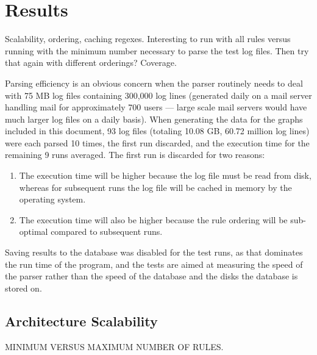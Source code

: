 \documentclass[draft]{svmult}
\newcommand{\numberOFlogFILES}[0]{%
    93%
}
\newcommand{\numberOFlogLINEShuman}[0]{%
    60.72 million%
}
\begin{document}
\section{Results}

Scalability, ordering, caching regexes.  Interesting to run with all rules
versus running with the minimum number necessary to parse the test log
files.  Then try that again with different orderings?  Coverage.

Parsing efficiency is an obvious concern when the parser routinely needs to
deal with 75 MB log files containing 300,000 log lines (generated daily on
a mail server handling mail for approximately 700 users --- large scale
mail servers would have much larger log files on a daily basis).  When
generating the data for the graphs included in this document,
\numberOFlogFILES{} log files (totaling 10.08 GB, \numberOFlogLINEShuman{}
log lines) were each parsed 10 times, the first run discarded, and the
execution time for the remaining 9 runs averaged.  The first run is
discarded for two reasons:

\begin{enumerate}

    \item The execution time will be higher because the log file must be
        read from disk, whereas for subsequent runs the log file will be
        cached in memory by the operating system.

    \item The execution time will also be higher because the rule ordering
        will be sub-optimal compared to subsequent runs.

\end{enumerate}

Saving results to the database was disabled for the test runs, as that
dominates the run time of the program, and the tests are aimed at measuring
the speed of the parser rather than the speed of the database and the disks
the database is stored on.

\subsection{Architecture Scalability}

MINIMUM VERSUS MAXIMUM NUMBER OF RULES\@.
\end{document}
